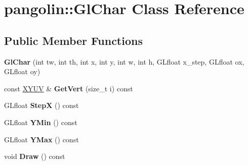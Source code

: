 \hypertarget{classpangolin_1_1_gl_char}{}\section{pangolin\+:\+:Gl\+Char Class Reference}
\label{classpangolin_1_1_gl_char}
\subsection*{Public Member Functions}
\begin{DoxyCompactItemize}
\item 
{\bfseries Gl\+Char} (int tw, int th, int x, int y, int w, int h, G\+Lfloat x\+\_\+step, G\+Lfloat ox, G\+Lfloat oy)\hypertarget{classpangolin_1_1_gl_char_a3a0248ed0d062da8591e61c1063d9d67}{}\label{classpangolin_1_1_gl_char_a3a0248ed0d062da8591e61c1063d9d67}

\item 
const \hyperlink{structpangolin_1_1_x_y_u_v}{X\+Y\+UV} \& {\bfseries Get\+Vert} (size\+\_\+t i) const \hypertarget{classpangolin_1_1_gl_char_a5fdd81d07442e6a23d17710c683f0d6f}{}\label{classpangolin_1_1_gl_char_a5fdd81d07442e6a23d17710c683f0d6f}

\item 
G\+Lfloat {\bfseries StepX} () const \hypertarget{classpangolin_1_1_gl_char_a7aaf096e5e79714e8b6ab019b1e91827}{}\label{classpangolin_1_1_gl_char_a7aaf096e5e79714e8b6ab019b1e91827}

\item 
G\+Lfloat {\bfseries Y\+Min} () const \hypertarget{classpangolin_1_1_gl_char_a473b6ef3364fb61fa13fd0570fd8ccaa}{}\label{classpangolin_1_1_gl_char_a473b6ef3364fb61fa13fd0570fd8ccaa}

\item 
G\+Lfloat {\bfseries Y\+Max} () const \hypertarget{classpangolin_1_1_gl_char_a6e578fe46229f90db5ffad9cf73e6a70}{}\label{classpangolin_1_1_gl_char_a6e578fe46229f90db5ffad9cf73e6a70}

\item 
void {\bfseries Draw} () const \hypertarget{classpangolin_1_1_gl_char_a9528065311eb6a1ff519b941b7c80d39}{}\label{classpangolin_1_1_gl_char_a9528065311eb6a1ff519b941b7c80d39}

\end{DoxyCompactItemize}
